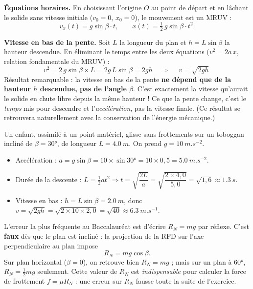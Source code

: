 \documentclass[11pt]{article}
\begin{document}
\textbf{Équations horaires.} En choisissant l'origine $O$ au point de départ et en lâchant le solide sans vitesse initiale ($v_0 = 0$, $x_0 = 0$), le mouvement est un MRUV :
\[
v_x(t) = g\sin\beta \cdot t,
\qquad
x(t) = \tfrac{1}{2}\,g\sin\beta \cdot t^{2}.
\]

\textbf{Vitesse en bas de la pente.} Soit $L$ la longueur du plan et $h = L\sin\beta$ la hauteur descendue. En éliminant le temps entre les deux équations ($v^{2} = 2a\,x$, relation fondamentale du MRUV) :
\[
v^{2} = 2\,g\sin\beta \times L = 2g\,L\sin\beta = 2gh
\quad\Longrightarrow\quad
\boxed{\;v = \sqrt{2gh}\;}
\]
Résultat remarquable : la vitesse en bas de la pente \textbf{ne dépend que de la hauteur $h$ descendue, pas de l'angle $\beta$}. C'est exactement la vitesse qu'aurait le solide en chute libre depuis la même hauteur ! Ce que la pente change, c'est le \emph{temps} mis pour descendre et l'\emph{accélération}, pas la vitesse finale. (Ce résultat se retrouvera naturellement avec la conservation de l'énergie mécanique.)

\begin{exemplebox}
Un enfant, assimilé à un point matériel, glisse sans frottements sur un toboggan incliné de $\beta = 30°$, de longueur $L = \SI{4,0}{m}$. On prend $g = \SI{10}{m.s^{-2}}$.
\begin{itemize}
\item Accélération : $a = g\sin\beta = 10 \times \sin 30° = 10 \times 0{,}5 = \SI{5,0}{m.s^{-2}}$.
\item Durée de la descente : $L = \tfrac{1}{2}at^{2} \Rightarrow t = \sqrt{\dfrac{2L}{a}} = \sqrt{\dfrac{2 \times 4{,}0}{5{,}0}} = \sqrt{1{,}6} \approx \SI{1,3}{s}$.
\item Vitesse en bas : $h = L\sin\beta = \SI{2,0}{m}$, donc $v = \sqrt{2gh} = \sqrt{2 \times 10 \times 2{,}0} = \sqrt{40} \approx \SI{6,3}{m.s^{-1}}$.
\end{itemize}
\end{exemplebox}

\begin{attention}
L'erreur la plus fréquente au Baccalauréat est d'écrire $R_N = mg$ par réflexe. C'est \textbf{faux} dès que le plan est incliné : la projection de la RFD sur l'axe perpendiculaire au plan impose
\[
R_N = mg\cos\beta.
\]
Sur plan horizontal ($\beta = 0$), on retrouve bien $R_N = mg$ ; mais sur un plan à $60°$, $R_N = \tfrac{1}{2}mg$ seulement. Cette valeur de $R_N$ est \emph{indispensable} pour calculer la force de frottement $f = \mu R_N$ : une erreur sur $R_N$ fausse toute la suite de l'exercice.
\end{attention}
\end{document}
